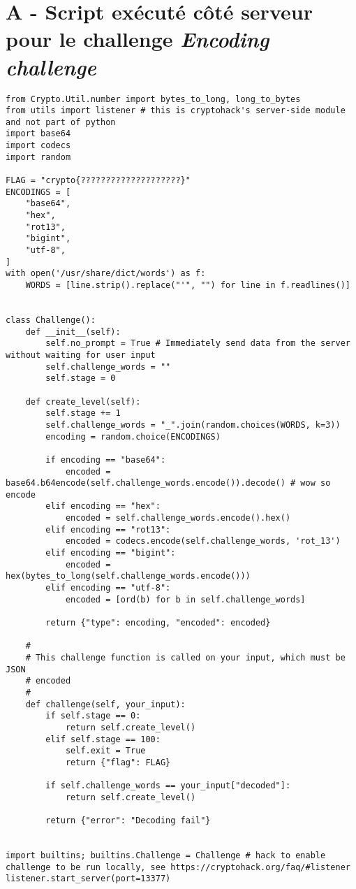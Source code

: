 
\section*{A - Script exécuté côté serveur pour le challenge \textit{Encoding challenge}}
\label{annexe:script-server-encoding}

\begin{lstlisting}
from Crypto.Util.number import bytes_to_long, long_to_bytes
from utils import listener # this is cryptohack's server-side module and not part of python
import base64
import codecs
import random

FLAG = "crypto{????????????????????}"
ENCODINGS = [
    "base64",
    "hex",
    "rot13",
    "bigint",
    "utf-8",
]
with open('/usr/share/dict/words') as f:
    WORDS = [line.strip().replace("'", "") for line in f.readlines()]


class Challenge():
    def __init__(self):
        self.no_prompt = True # Immediately send data from the server without waiting for user input
        self.challenge_words = ""
        self.stage = 0

    def create_level(self):
        self.stage += 1
        self.challenge_words = "_".join(random.choices(WORDS, k=3))
        encoding = random.choice(ENCODINGS)

        if encoding == "base64":
            encoded = base64.b64encode(self.challenge_words.encode()).decode() # wow so encode
        elif encoding == "hex":
            encoded = self.challenge_words.encode().hex()
        elif encoding == "rot13":
            encoded = codecs.encode(self.challenge_words, 'rot_13')
        elif encoding == "bigint":
            encoded = hex(bytes_to_long(self.challenge_words.encode()))
        elif encoding == "utf-8":
            encoded = [ord(b) for b in self.challenge_words]

        return {"type": encoding, "encoded": encoded}

    #
    # This challenge function is called on your input, which must be JSON
    # encoded
    #
    def challenge(self, your_input):
        if self.stage == 0:
            return self.create_level()
        elif self.stage == 100:
            self.exit = True
            return {"flag": FLAG}

        if self.challenge_words == your_input["decoded"]:
            return self.create_level()

        return {"error": "Decoding fail"}


import builtins; builtins.Challenge = Challenge # hack to enable challenge to be run locally, see https://cryptohack.org/faq/#listener
listener.start_server(port=13377)
\end{lstlisting}

